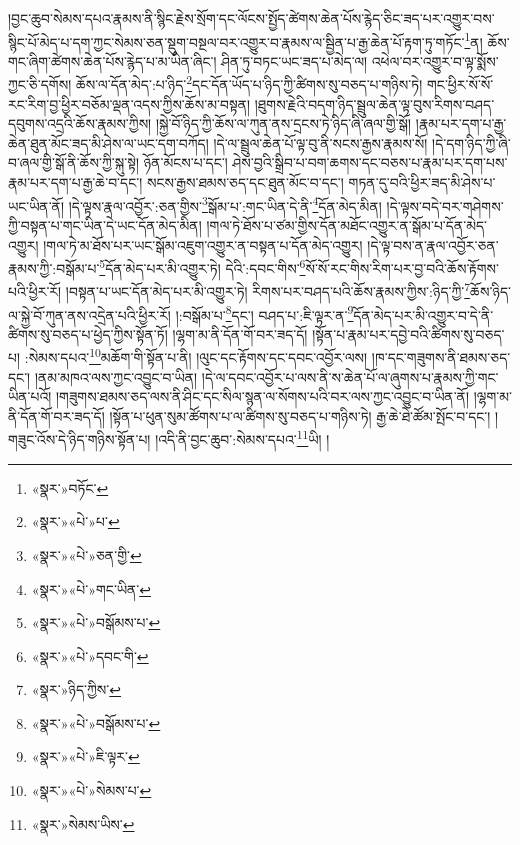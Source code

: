 །བྱང་ཆུབ་སེམས་དཔའ་རྣམས་ནི་སྙིང་རྗེས་སྲོག་དང་ལོངས་སྤྱོད་ཚེགས་ཆེན་པོས་རྙེད་ཅིང་ཟད་པར་འགྱུར་བས་སྙིང་པོ་མེད་པ་དག་ཀྱང་སེམས་ཅན་སྡུག་བསྔལ་བར་འགྱུར་བ་རྣམས་ལ་སྦྱིན་པ་རྒྱ་ཆེན་པོ་རྟག་ཏུ་གཏོང་\footnote{«སྣར་»བཏོང་}ན། ཆོས་གང་ཞིག་ཚེགས་ཆེན་པོས་རྙེད་པ་མ་ཡིན་ཞིང་། ཤིན་ཏུ་བཏང་ཡང་ཟད་པ་མེད་ལ། འཕེལ་བར་འགྱུར་བ་ལྟ་སྨོས་ཀྱང་ཅི་དགོས། ཆོས་ལ་དོན་མེད་:པ་ཉིད་\footnote{«སྣར་»«པེ་»པ་}དང་དོན་ཡོད་པ་ཉིད་ཀྱི་ཚིགས་སུ་བཅད་པ་གཉིས་ཏེ། གང་ཕྱིར་སོ་སོ་རང་རིག་བྱ་ཕྱིར་བཅོམ་ལྡན་འདས་ཀྱིས་ཆོས་མ་བསྟན། །ཐུགས་རྗེའི་བདག་ཉིད་སྦྲུལ་ཆེན་ལྟ་བུས་རིགས་བཤད་དབུགས་འདྲའི་ཆོས་རྣམས་ཀྱིས། །སྐྱེ་བོ་ཉིད་ཀྱི་ཆོས་ལ་ཀུན་ནས་དྲངས་ཏེ་ཉིད་ཞི་ཞལ་གྱི་སྒོ། །རྣམ་པར་དག་པ་རྒྱ་ཆེན་ཐུན་མོང་ཟད་མི་ཤེས་ལ་ཡང་དག་བཀོད། །དེ་ལ་སྦྲུལ་ཆེན་པོ་ལྟ་བུ་ནི་སངས་རྒྱས་རྣམས་སོ། །དེ་དག་ཉིད་ཀྱི་ཞི་བ་ཞལ་གྱི་སྒོ་ནི་ཆོས་ཀྱི་སྐུ་སྟེ། ཉོན་མོངས་པ་དང་། ཤེས་བྱའི་སྒྲིབ་པ་བག་ཆགས་དང་བཅས་པ་རྣམ་པར་དག་པས་རྣམ་པར་དག་པ་རྒྱ་ཆེ་བ་དང་། སངས་རྒྱས་ཐམས་ཅད་དང་ཐུན་མོང་བ་དང་། གཏན་དུ་བའི་ཕྱིར་ཟད་མི་ཤེས་པ་ཡང་ཡིན་ནོ། །དེ་ལྟས་རྣལ་འབྱོར་:ཅན་གྱིས་\footnote{«སྣར་»«པེ་»ཅན་གྱི་}སྒོམ་པ་:གང་ཡིན་དེ་ནི་\footnote{«སྣར་»«པེ་»གང་ཡིན་}དོན་མེད་མིན། །དེ་ལྟས་བདེ་བར་གཤེགས་ཀྱི་བསྟན་པ་གང་ཡིན་དེ་ཡང་དོན་མེད་མིན། །གལ་ཏེ་ཐོས་པ་ཙམ་གྱིས་དོན་མཐོང་འགྱུར་ན་སྒོམ་པ་དོན་མེད་འགྱུར། །གལ་ཏེ་མ་ཐོས་པར་ཡང་སྒོམ་འཇུག་འགྱུར་ན་བསྟན་པ་དོན་མེད་འགྱུར། །དེ་ལྟ་བས་ན་རྣལ་འབྱོར་ཅན་རྣམས་ཀྱི་:བསྒོམ་པ་\footnote{«སྣར་»«པེ་»བསྒོམས་པ་}དོན་མེད་པར་མི་འགྱུར་ཏེ། དེའི་:དབང་གིས་\footnote{«སྣར་»«པེ་»དབང་གི་}སོ་སོ་རང་གིས་རིག་པར་བྱ་བའི་ཆོས་རྟོགས་པའི་ཕྱིར་རོ། །བསྟན་པ་ཡང་དོན་མེད་པར་མི་འགྱུར་ཏེ། རིགས་པར་བཤད་པའི་ཆོས་རྣམས་ཀྱིས་:ཉིད་ཀྱི་\footnote{«སྣར་»ཉིད་ཀྱིས་}ཆོས་ཉིད་ལ་སྐྱེ་བོ་ཀུན་ནས་འདྲེན་པའི་ཕྱིར་རོ། །:བསྒོམ་པ་\footnote{«སྣར་»«པེ་»བསྒོམས་པ་}དང་། བཤད་པ་:ཇི་ལྟར་ན་\footnote{«སྣར་»«པེ་»ཇི་ལྟར་}དོན་མེད་པར་མི་འགྱུར་བ་དེ་ནི་ཚིགས་སུ་བཅད་པ་ཕྱེད་ཀྱིས་སྟོན་ཏོ། །ལྷག་མ་ནི་དོན་གོ་བར་ཟད་དོ། །སྟོན་པ་རྣམ་པར་དབྱེ་བའི་ཚིགས་སུ་བཅད་པ། :སེམས་དཔའ་\footnote{«སྣར་»«པེ་»སེམས་པ་}མཆོག་གི་སྟོན་པ་ནི། །ལུང་དང་རྟོགས་དང་དབང་འབྱོར་ལས། །ཁ་དང་གཟུགས་ནི་ཐམས་ཅད་དང་། །ནམ་མཁའ་ལས་ཀྱང་འབྱུང་བ་ཡིན། །དེ་ལ་དབང་འབྱོར་པ་ལས་ནི་ས་ཆེན་པོ་ལ་ཞུགས་པ་རྣམས་ཀྱི་གང་ཡིན་པའོ། །གཟུགས་ཐམས་ཅད་ལས་ནི་ཤིང་དང་སིལ་སྙན་ལ་སོགས་པའི་བར་ལས་ཀྱང་འབྱུང་བ་ཡིན་ནོ། །ལྷག་མ་ནི་དོན་གོ་བར་ཟད་དོ། །སྟོན་པ་ཕུན་སུམ་ཚོགས་པ་ལ་ཚིགས་སུ་བཅད་པ་གཉིས་ཏེ། རྒྱ་ཆེ་ཐེ་ཚོམ་སྤོང་བ་དང་། །གཟུང་འོས་དེ་ཉིད་གཉིས་སྟོན་པ། །འདི་ནི་བྱང་ཆུབ་:སེམས་དཔའ་\footnote{«སྣར་»སེམས་ཡིས་}ཡི། །
